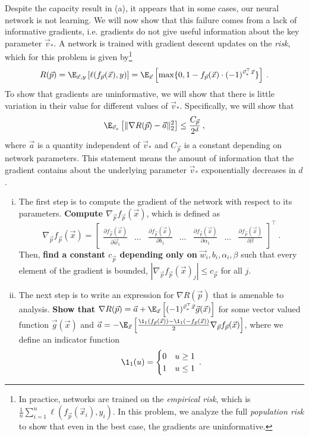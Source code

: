 \documentclass[preview]{standalone}
\begin{document}
\begin{Parts}
\Part Despite the capacity result in (a), it appears that in some cases, our neural network is not learning. We will now show that this failure comes from a lack of informative gradients, i.e. gradients do not give useful information about the key parameter $\vec v_*$. A network is trained with gradient descent updates on the \emph{risk}, which for this problem is given by\footnote{
	In practice, networks are trained on the \emph{empirical risk}, which is $\frac{1}{n}\sum_{i=1}^n\ell(f_{\vec p}(\vec x_i), y_i)$. In this problem, we analyze the full \emph{population risk} to show that even in the best case, the gradients are uninformative.
}
\[R(\vec p) = \E_{\vec x,y}\left[\ell(f_{\vec p}(\vec x), y)\right] = \E_{\vec x}\left[\max\{0,1-f_{\vec p}(\vec x)\cdot (-1)^{\vec v_*^\top \vec x}\} \right]\:.\]
To show that gradients are uninformative, we will show that there is little variation in their value for different values of $\vec v_*$.
Specifically, we will show that
\[\E_{\vec v_*}\left[\|\nabla R(\vec p) - \vec a\|_2^2\right] \leq \frac{C_{\vec p}}{2^d}\:,\]
where $\vec a$ is a quantity independent of $\vec v_*$ and $C_{\vec{p}}$ is a constant depending on network parameters. 
This statement means the amount of information that the gradient contains about the underlying parameter $\vec v_*$ exponentially decreases in $d$.
\begin{enumerate}[(i)]
\item The first step is to compute the gradient of the network with respect to its parameters.
{\bf Compute $\nabla_{\vec p} f_{\vec p}(\vec x)$}, which is defined as
\[\nabla_{\vec p} f_{\vec p}(\vec x) = 
\begin{bmatrix}
\frac{\partial f_{\vec p}(\vec x)}{\partial \vec w_{1}} 
 & \dots &
\frac{\partial f_{\vec p}(\vec x)}{\partial b_{1}}
 & \dots &
\frac{\partial f_{\vec p}(\vec x)}{\partial \alpha_{1}}
 & \dots &
\frac{\partial f_{\vec p}(\vec x)}{\partial \beta}
\end{bmatrix}^\top \:.\]
Then, {\bf find a constant $c_{\vec p}$ depending only on} $\vec w_i,b_i,\alpha_i,\beta$ such that every element of the gradient is bounded, $|\nabla_{\vec p} f_{\vec p}(\vec x)_j| \leq c_{\vec p}$ for all $j$.




\item The next step is to write an expression for $\nabla R(\vec p)$ that is amenable to analysis. {\bf Show that} $\nabla R(\vec p) = \vec a + \E_{\vec x}\left[(-1)^{\vec v_*^\top\vec x} \vec g(\vec x)\right]$ for some vector valued function $\vec g(\vec x)$ and $\vec a = -\E_{\vec x}\left[ \frac{\1_1(f_{\vec p}(\vec x))-\1_1(-f_{\vec p}(\vec x))}{2} \nabla_{\vec p}f_{\vec p}(\vec x) \right]$, where we define an indicator function
\[\1_1(u) = \begin{cases}0 & u \geq 1\\ 1 & u\leq 1\end{cases}\:.\]


\end{enumerate}
\end{Parts}
\end{document}
